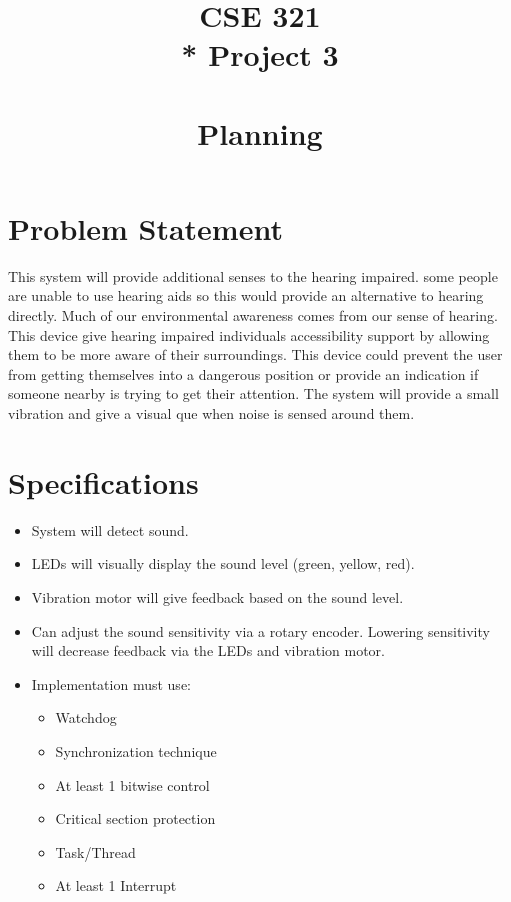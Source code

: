 \documentclass{article}
\title{\Huge{\textbf{CSE 321}  \\* Project 3 \\~\\ \textbf{Planning}}}
\date{} %
\begin{document}


\setcounter{secnumdepth}{-1}


\section{Problem Statement}
This system will provide additional senses to the hearing impaired.
some people are unable to use hearing aids so this would provide an 
alternative to hearing directly.  
\newline
\noindent
Much of our environmental awareness 
comes from our sense of hearing. This device give hearing impaired
individuals accessibility support by allowing them to be more aware
of their surroundings.  This device could prevent the user from 
getting themselves into a dangerous position or provide an indication
if someone nearby is trying to get their attention.
The system will provide a small vibration and give a visual que
when noise is sensed around them.

\section{Specifications}
\begin{itemize}
    \item System will detect sound.
    \item LEDs will visually display the sound level (green, yellow, red).
    \item Vibration motor will give feedback based on the sound level.
    \item Can adjust the sound sensitivity via a rotary encoder. Lowering sensitivity will 
            decrease feedback via the LEDs and vibration motor.
    \item Implementation must use:
    \begin{itemize}
        \item Watchdog
        \item Synchronization technique
        \item At least 1 bitwise control
        \item Critical section protection
        \item Task/Thread
        \item At least 1 Interrupt
    \end{itemize}
  \end{itemize}
\end{document}
